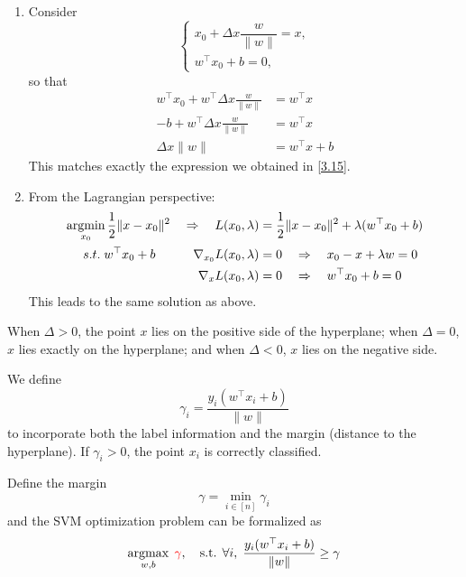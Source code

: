 \documentclass[../main]{subfiles}
\begin{document}
\begin{enumerate}
    \item Consider
    \[
        \begin{cases}
            x_0 + \Delta x \dfrac{w}{\|w\|} = x, \\
            w^\top x_0 + b = 0,
        \end{cases}
    \]
    so that
    \begin{align*}
        w^\top x_0 + w^\top \Delta x \frac{w}{\|w\|} &= w^\top x\\
        -b + w^\top \Delta x \frac{w}{\|w\|} &= w^\top x\\
        \Delta x \|w\| &= w^\top x + b
    \end{align*}
    This matches exactly the expression we obtained in \eqref{3.15}.
    
    \item From the Lagrangian perspective:
    \begin{align*}
        \mathop{\mathrm{argmin}}_{x_0}\frac{1}{2}\|x-x_0\|^2\quad\Rightarrow\quad L(x_0,\lambda)&=\frac{1}{2}\|x-x_0\|^2+\lambda(w^\top x_0+b)\\
        s.t.\; w^\top x_0+b\quad \quad\quad\nabla_{x_0}L(x_0,\lambda)&=0\quad\Rightarrow\quad x_0-x+\lambda w=0\\
        \nabla_xL(x_0,\lambda)&=0\quad\Rightarrow \quad w^\top x_0+b=0
    \end{align*}
    This leads to the same solution as above.
\end{enumerate}
When $\Delta > 0$, the point $x$ lies on the positive side of the hyperplane;  
when $\Delta = 0$, $x$ lies exactly on the hyperplane;  
and when $\Delta < 0$, $x$ lies on the negative side.  

We define
\begin{equation}
    \gamma_i = \frac{y_i(w^\top x_i + b)}{\|w\|}
\end{equation}
to incorporate both the label information and the margin (distance to the hyperplane).  
If $\gamma_i > 0$, the point $x_i$ is correctly classified.  

Define the margin
\begin{equation}
    \gamma = \min_{i \in [n]} \gamma_i
\end{equation}
and the SVM optimization problem can be formalized as
\begin{equation}
    \mathop{\mathrm{argmax}}_{w,b} \; {\color{red}{\gamma}}, 
    \quad \text{s.t. } \forall i, \; \frac{y_i (w^\top x_i + b)}{\|w\|} \geq \gamma
\end{equation}
\end{document}
